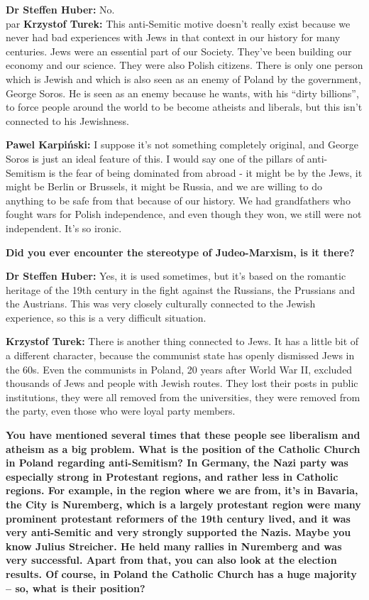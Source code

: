 \textbf{Dr Steffen Huber:} No.\\par
\textbf{Krzystof Turek:} This anti-Semitic motive doesn’t really exist because we never had bad experiences with Jews in that context in our history for many centuries. Jews were an essential part of our Society. They've been building our economy and our science. They were also Polish citizens. There is only one person which is Jewish and which is also seen as an enemy of Poland by the government, George Soros. He is seen as an enemy because he wants, with his “dirty billions”, to force people around the world to be become atheists and liberals, but this isn’t connected to his Jewishness.\par
\textbf{Pawel Karpiński:} I suppose it's not something completely original, and George Soros is just an ideal feature of this. I would say one of the pillars of anti-Semitism is the fear of being dominated from abroad - it might be by the Jews, it might be Berlin or Brussels, it might be Russia, and we are willing to do anything to be safe from that because of our history. We had grandfathers who fought wars for Polish independence, and even though they won, we still were not independent. It's so ironic.  

\textbf{Did you ever encounter the stereotype of Judeo-Marxism, is it there?} 

\textbf{Dr Steffen Huber:} Yes, it is used sometimes, but it's based on the romantic heritage of the 19th century in the fight against the Russians, the Prussians and the Austrians. This was very closely culturally connected to the Jewish experience, so this is a very difficult situation.\par
\textbf{Krzystof Turek:} There is another thing connected to Jews. It has a little bit of a different character, because the communist state has openly dismissed Jews in the 60s. Even the communists in Poland, 20 years after World War II, excluded thousands of Jews and people with Jewish routes. They lost their posts in public institutions, they were all removed from the universities, they were removed from the party, even those who were loyal party members. 

\textbf{You have mentioned several times that these people see liberalism and atheism as a big problem. What is the position of the Catholic Church in Poland regarding anti-Semitism? In Germany, the Nazi party was especially strong in Protestant regions, and rather less in Catholic regions. For example, in the region where we are from, it's in Bavaria, the City is Nuremberg, which is a largely protestant region were many prominent protestant reformers of the 19th century lived, and it was very anti-Semitic and very strongly supported the Nazis. Maybe you know Julius Streicher. He held many rallies in Nuremberg and was very successful. Apart from that, you can also look at the election results. Of course, in Poland the Catholic Church has a huge majority – so, what is their position?} 

